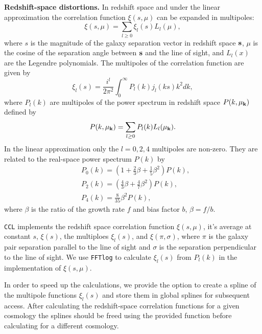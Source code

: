 \documentclass[\docopts]{\docclass}
\newcommand{\ccl}{{\tt CCL}\xspace}
\begin{document}
{\bf Redshift-space distortions.} In redshift space and under the linear approximation \citep{Kaiser1987} the correlation function $\xi(s,\mu)$ can be expanded in multipoles:
\begin{equation}
\xi(s,\mu) = \sum_{l\geq 0} \xi_l(s) L_l(\mu),
\end{equation}
where $s$ is the magnitude of the galaxy separation vector in redshift space $\bf s$, $\mu$ is the cosine of the separation angle between $\bf s$ and the line of sight, and $L_l(x)$ are the Legendre polynomials. The multipoles of the correlation function are given by
\begin{equation}
\xi_l(s) = \frac{i^l}{2 \pi^2} \int_0^{\infty} P_l(k) j_l(k s) k^2 dk,
\end{equation}
where $P_l(k)$ are multipoles of the power spectrum in redshift space $P(k,\mu_{\bf k})$ defined by
\begin{equation}
P(k,\mu_{\bf k}) = \sum_{l\geq 0} P_l(k) L_l(\mu_{\bf k}).
\end{equation}
In the linear approximation only the $l = 0,2,4$ multipoles are non-zero. They are related to the
real-space power spectrum $P(k)$ by
\begin{eqnarray}
&P_0(k) = \left(1+\frac{2}{3}\beta+\frac{1}{5}\beta^2\right)P(k),\\
&P_2(k) = \left(\frac{4}{3}\beta+\frac{4}{7}\beta^2\right)P(k),\\
&P_4(k) = \frac{8}{35}\beta^2 P(k),
\end{eqnarray}
where $\beta$ is the ratio of the growth rate $f$ and bias factor $b$, $\beta = f/b$.

\ccl implements the redshift space correlation function $\xi(s, \mu)$, it's average at constant $s$, $\xi(s)$,
the multiploes $\xi_l(s)$, and $\xi(\pi, \sigma)$, where $\pi$ is the galaxy pair separation
parallel to the line of sight and $\sigma$ is the separation perpendicular to the line of sight.
We use {\tt FFTlog} to calculate $\xi_l(s)$ from $P_l(k)$ in the implementation of $\xi(s,\mu)$.


In order to speed up the calculations, we provide the option to create a spline of the multipole functions $\xi_l(s)$ and store them in global splines for subsequent access. After calculating the redshift-space correlation functions for a given cosmology the splines should be freed using the provided function before calculating for a different cosmology.


%
%
\end{document}
